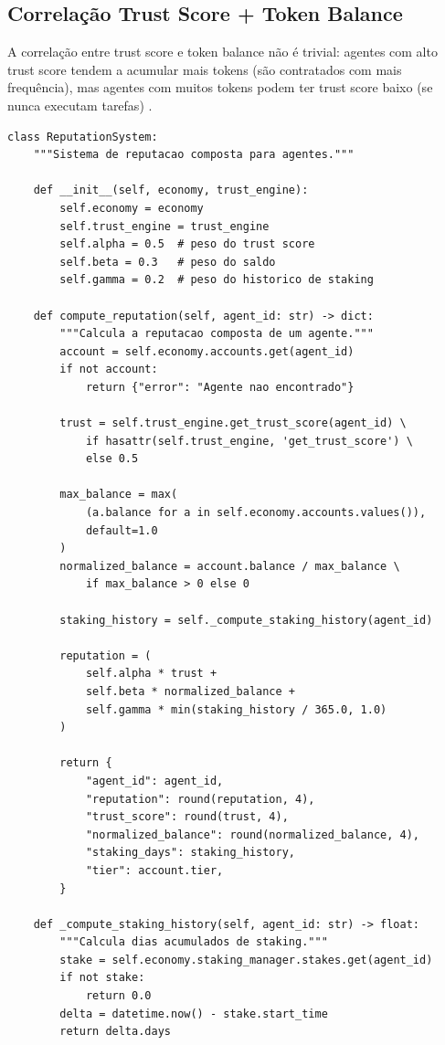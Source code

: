 \subsection{Correlação Trust Score + Token Balance}

A correlação entre trust score e token balance não é trivial:
agentes com alto trust score tendem a acumular mais tokens (são
contratados com mais frequência), mas agentes com muitos tokens
podem ter trust score baixo (se nunca executam tarefas)
\cite{opencode2026ecosystem}.

\begin{lstlisting}[caption={Sistema de reputacao composta},
                  label={lst:reputacao}]
class ReputationSystem:
    """Sistema de reputacao composta para agentes."""

    def __init__(self, economy, trust_engine):
        self.economy = economy
        self.trust_engine = trust_engine
        self.alpha = 0.5  # peso do trust score
        self.beta = 0.3   # peso do saldo
        self.gamma = 0.2  # peso do historico de staking

    def compute_reputation(self, agent_id: str) -> dict:
        """Calcula a reputacao composta de um agente."""
        account = self.economy.accounts.get(agent_id)
        if not account:
            return {"error": "Agente nao encontrado"}

        trust = self.trust_engine.get_trust_score(agent_id) \
            if hasattr(self.trust_engine, 'get_trust_score') \
            else 0.5

        max_balance = max(
            (a.balance for a in self.economy.accounts.values()),
            default=1.0
        )
        normalized_balance = account.balance / max_balance \
            if max_balance > 0 else 0

        staking_history = self._compute_staking_history(agent_id)

        reputation = (
            self.alpha * trust +
            self.beta * normalized_balance +
            self.gamma * min(staking_history / 365.0, 1.0)
        )

        return {
            "agent_id": agent_id,
            "reputation": round(reputation, 4),
            "trust_score": round(trust, 4),
            "normalized_balance": round(normalized_balance, 4),
            "staking_days": staking_history,
            "tier": account.tier,
        }

    def _compute_staking_history(self, agent_id: str) -> float:
        """Calcula dias acumulados de staking."""
        stake = self.economy.staking_manager.stakes.get(agent_id)
        if not stake:
            return 0.0
        delta = datetime.now() - stake.start_time
        return delta.days


\end{lstlisting}
